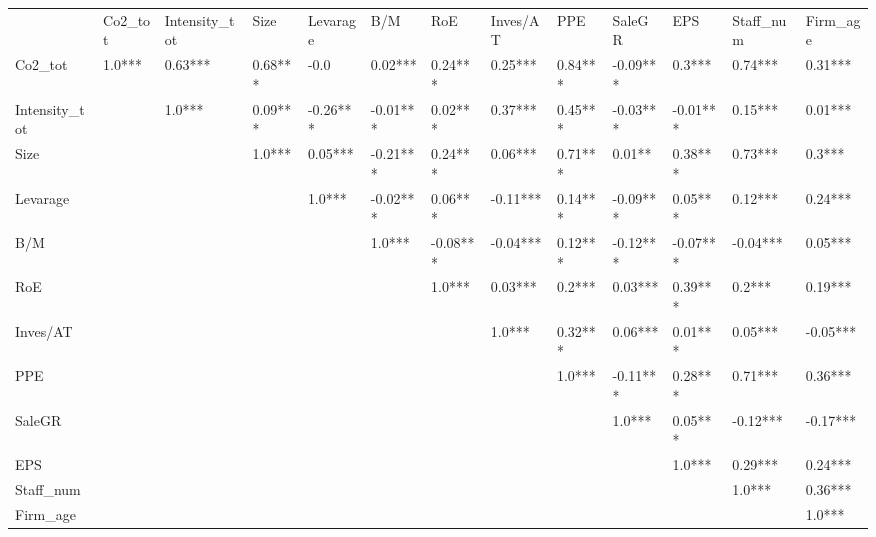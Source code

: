 \begin{tabular}{lllllllllllll}
 & Co2\_tot & Intensity\_tot & Size & Levarage & B/M & RoE & Inves/AT & PPE & SaleGR & EPS & Staff\_num & Firm\_age \\
Co2\_tot & 1.0*** & 0.63*** & 0.68*** & -0.0 & 0.02*** & 0.24*** & 0.25*** & 0.84*** & -0.09*** & 0.3*** & 0.74*** & 0.31*** \\
Intensity\_tot &  & 1.0*** & 0.09*** & -0.26*** & -0.01*** & 0.02*** & 0.37*** & 0.45*** & -0.03*** & -0.01*** & 0.15*** & 0.01*** \\
Size &  &  & 1.0*** & 0.05*** & -0.21*** & 0.24*** & 0.06*** & 0.71*** & 0.01** & 0.38*** & 0.73*** & 0.3*** \\
Levarage &  &  &  & 1.0*** & -0.02*** & 0.06*** & -0.11*** & 0.14*** & -0.09*** & 0.05*** & 0.12*** & 0.24*** \\
B/M &  &  &  &  & 1.0*** & -0.08*** & -0.04*** & 0.12*** & -0.12*** & -0.07*** & -0.04*** & 0.05*** \\
RoE &  &  &  &  &  & 1.0*** & 0.03*** & 0.2*** & 0.03*** & 0.39*** & 0.2*** & 0.19*** \\
Inves/AT &  &  &  &  &  &  & 1.0*** & 0.32*** & 0.06*** & 0.01*** & 0.05*** & -0.05*** \\
PPE &  &  &  &  &  &  &  & 1.0*** & -0.11*** & 0.28*** & 0.71*** & 0.36*** \\
SaleGR &  &  &  &  &  &  &  &  & 1.0*** & 0.05*** & -0.12*** & -0.17*** \\
EPS &  &  &  &  &  &  &  &  &  & 1.0*** & 0.29*** & 0.24*** \\
Staff\_num &  &  &  &  &  &  &  &  &  &  & 1.0*** & 0.36*** \\
Firm\_age &  &  &  &  &  &  &  &  &  &  &  & 1.0*** \\
\end{tabular}
